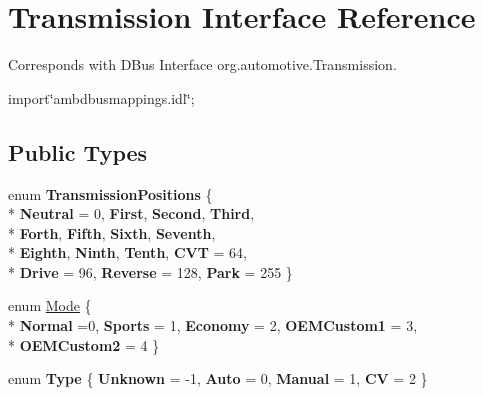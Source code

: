 \hypertarget{interfaceTransmission}{\section{Transmission Interface Reference}
\label{interfaceTransmission}
}


Corresponds with D\+Bus Interface org.\+automotive.\+Transmission.  




{\ttfamily import\char`\"{}ambdbusmappings.\+idl\char`\"{};}

\subsection*{Public Types}
\begin{DoxyCompactItemize}
\item 
\hypertarget{interfaceTransmission_adca9345a62115b7a722fc66fccff434c}{enum {\bfseries Transmission\+Positions} \{ \\*
{\bfseries Neutral} = 0, 
{\bfseries First}, 
{\bfseries Second}, 
{\bfseries Third}, 
\\*
{\bfseries Forth}, 
{\bfseries Fifth}, 
{\bfseries Sixth}, 
{\bfseries Seventh}, 
\\*
{\bfseries Eighth}, 
{\bfseries Ninth}, 
{\bfseries Tenth}, 
{\bfseries C\+V\+T} = 64, 
\\*
{\bfseries Drive} = 96, 
{\bfseries Reverse} = 128, 
{\bfseries Park} = 255
 \}}\label{interfaceTransmission_adca9345a62115b7a722fc66fccff434c}

\item 
enum \hyperlink{interfaceTransmission_a15d0278c6e0dc75cd28f5aeaadb86680}{Mode} \{ \\*
{\bfseries Normal} =0, 
{\bfseries Sports} = 1, 
{\bfseries Economy} = 2, 
{\bfseries O\+E\+M\+Custom1} = 3, 
\\*
{\bfseries O\+E\+M\+Custom2} = 4
 \}
\item 
\hypertarget{interfaceTransmission_ae88e058c356841ec4b74c89004aeba78}{enum {\bfseries Type} \{ {\bfseries Unknown} = -\/1, 
{\bfseries Auto} = 0, 
{\bfseries Manual} = 1, 
{\bfseries C\+V} = 2
 \}}\label{interfaceTransmission_ae88e058c356841ec4b74c89004aeba78}

\end{DoxyCompactItemize}
